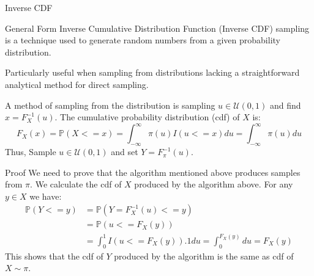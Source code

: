 \documentclass{beamer}
\begin{document}
\begin{section}{Inverse CDF}
    \begin{frame}{General Form}
        Inverse Cumulative Distribution Function (Inverse CDF) sampling is a technique used to generate random numbers from a given probability distribution.

        Particularly useful when sampling from distributions lacking a straightforward analytical method for direct sampling. 
    \end{frame}

    \begin{frame}
        A method of sampling from the distribution is sampling $u\in \mathcal{U}(0,1)$ and find $x = F_X^{-1}(u)$. The cumulative probability distribution (cdf) of $X$ is:
        \begin{equation}
            F_X(x) = \mathbb{P}(X<=x) = \int_{-\infty}^{\infty} \pi(u)I(u<=x)du = \int_{-\infty}^{\infty}\pi(u)du 
        \end{equation}
        Thus, Sample $u\in \mathcal{U}(0,1)$ and set $Y=F_{\pi}^{-1}(u)$. 
    \end{frame}

    \begin{frame}{Proof}
        We need to prove that the algorithm mentioned above produces samples from $\pi$. We calculate the cdf of $X$ produced by the algorithm above. For any $y\in X$ we have:
        \begin{align*}
            \mathbb{P}(Y<=y) &= \mathbb{P}(Y=F_X^{-1}(u)<=y) \\
            &= \mathbb{P}(u<=F_X(y)) \\
            &= \int_0^1 I(u<=F_X(y)).1du = \int_0^{F_X(y)}du = F_X(y)
        \end{align*}
        This shows that the cdf of $Y$ produced by the algorithm is the same as cdf of $X\sim \pi$.
    \end{frame}


\end{section}
\end{document}
